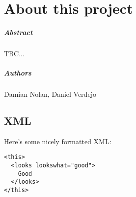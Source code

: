 
\chapter*{About this project}
\paragraph{Abstract}

TBC...

\paragraph{Authors}
Damian Nolan, Daniel Verdejo






\section{XML}
Here's some nicely formatted XML:
\begin{verbatim}
<this>
  <looks lookswhat="good">
    Good
  </looks>
</this>
\end{verbatim}

% 
%
%





